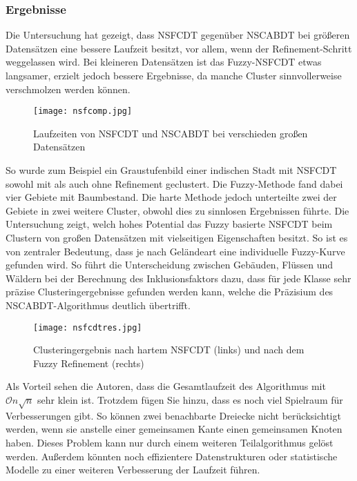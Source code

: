 \documentclass[11pt,ceqn]{book}
\begin{document}
\subsubsection{Ergebnisse}
Die Untersuchung hat gezeigt, dass NSFCDT gegenüber NSCABDT bei größeren Datensätzen eine bessere Laufzeit besitzt, vor allem, wenn der Refinement-Schritt weggelassen wird. Bei kleineren Datensätzen ist das Fuzzy-NSFCDT etwas langsamer, erzielt jedoch bessere Ergebnisse, da manche Cluster sinnvollerweise verschmolzen werden können.

\begin{figure}[H]
\centering
\texttt{[image: nsfcomp.jpg]}
\caption{Laufzeiten von NSFCDT und NSCABDT bei verschieden großen Datensätzen}
\end{figure}

So wurde zum Beispiel ein Graustufenbild einer indischen Stadt mit NSFCDT sowohl mit als auch ohne Refinement geclustert. Die Fuzzy-Methode fand dabei vier Gebiete mit Baumbestand. Die harte Methode jedoch unterteilte zwei der Gebiete in zwei weitere Cluster, obwohl dies zu sinnlosen Ergebnissen führte. Die Untersuchung zeigt, welch hohes Potential das Fuzzy basierte NSFCDT beim Clustern von großen Datensätzen mit vielseitigen Eigenschaften besitzt. So ist es von zentraler Bedeutung, dass je nach Geländeart eine individuelle Fuzzy-Kurve gefunden wird. So führt die Unterscheidung zwischen Gebäuden, Flüssen und Wäldern bei der Berechnung des Inklusionsfaktors dazu, dass für jede Klasse sehr präzise Clusteringergebnisse gefunden werden kann, welche die Präzisium des NSCABDT-Algorithmus deutlich übertrifft.

\begin{figure}[H]
\centering
\texttt{[image: nsfcdtres.jpg]}
\caption{Clusteringergebnis nach hartem NSFCDT (links) und nach dem Fuzzy Refinement (rechts)}
\end{figure}


Als Vorteil sehen die Autoren, dass die Gesamtlaufzeit des Algorithmus mit $\mathcal{O}n\sqrt{n}$ sehr klein ist. Trotzdem fügen Sie hinzu, dass es noch viel Spielraum für Verbesserungen gibt. So können zwei benachbarte Dreiecke nicht berücksichtigt werden, wenn sie anstelle einer gemeinsamen Kante einen gemeinsamen Knoten haben. Dieses Problem kann nur durch einem weiteren Teilalgorithmus gelöst werden. Außerdem könnten noch effizientere Datenstrukturen oder statistische Modelle zu einer weiteren Verbesserung der Laufzeit führen.
 
\clearpage
\end{document}
